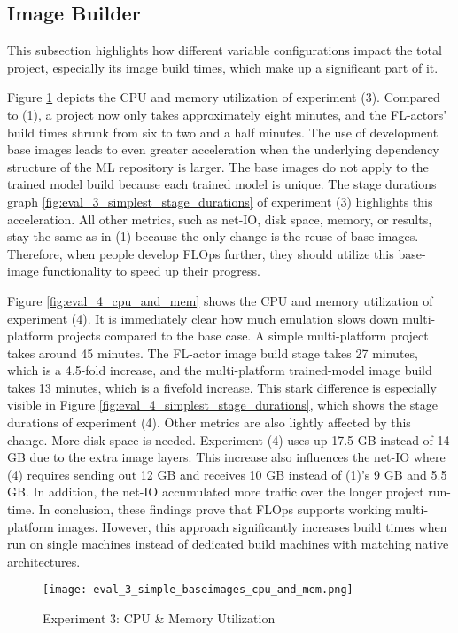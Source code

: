 \subsection{Image Builder}

This subsection highlights how different variable configurations impact the total project, especially its image build times, which make up a significant part of it.

Figure \ref{fig:eval_3_cpu_and_mem} depicts the CPU and memory utilization of experiment (3).
Compared to (1), a project now only takes approximately eight minutes, and the FL-actors' build times shrunk from six to two and a half minutes.
The use of development base images leads to even greater acceleration when the underlying dependency structure of the ML repository is larger.
The base images do not apply to the trained model build because each trained model is unique.
The stage durations graph \ref{fig:eval_3_simplest_stage_durations} of experiment (3) highlights this acceleration.
All other metrics, such as net-IO, disk space, memory, or results, stay the same as in (1) because the only change is the reuse of base images.
Therefore, when people develop FLOps further, they should utilize this base-image functionality to speed up their progress.

Figure \ref{fig:eval_4_cpu_and_mem} shows the CPU and memory utilization of experiment (4).
It is immediately clear how much emulation slows down multi-platform projects compared to the base case.
A simple multi-platform project takes around 45 minutes.
The FL-actor image build stage takes 27 minutes, which is a 4.5-fold increase, and the multi-platform trained-model image build takes 13 minutes, which is a fivefold increase.
This stark difference is especially visible in Figure \ref{fig:eval_4_simplest_stage_durations}, which shows the stage durations of experiment (4).
Other metrics are also lightly affected by this change.
More disk space is needed. 
Experiment (4) uses up 17.5 GB instead of 14 GB due to the extra image layers.
This increase also influences the net-IO where (4) requires sending out 12 GB and receives 10 GB instead of (1)'s 9 GB and 5.5 GB.
In addition, the net-IO accumulated more traffic over the longer project run-time.
In conclusion, these findings prove that FLOps supports working multi-platform images.
However, this approach significantly increases build times when run on single machines instead of dedicated build machines with matching native architectures.

\begin{figure}[H]
    \begin{adjustwidth}{-0.2\paperwidth}{-0.2\paperwidth}
        \centering
        \texttt{[image: eval\_3\_simple\_baseimages\_cpu\_and\_mem.png]}
        \caption{Experiment 3: CPU \& Memory Utilization}
        \label{fig:eval_3_cpu_and_mem}
    \end{adjustwidth}
\end{figure}

